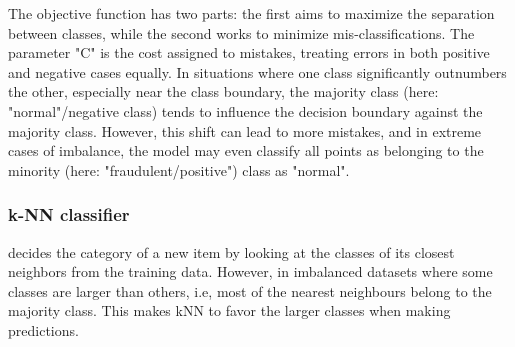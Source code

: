 \documentclass[letterpaper, 11 pt, conference]{ieeeconf}  %
\begin{document}
The objective function has two parts: the first aims to maximize the separation between classes, while the second works to minimize mis-classifications. The parameter "C" is the cost assigned to mistakes, treating errors in both positive and negative cases equally.
In situations where one class significantly outnumbers the other, especially near the class boundary, the majority class (here: "normal"/negative class) tends to influence the decision boundary against the majority class. However, this shift can lead to more mistakes, and in extreme cases of imbalance, the model may even classify all points as belonging to the minority (here: "fraudulent/positive") class as "normal".~\cite{10.1007/978-3-540-30115-8_7}
\subsubsection{k-NN classifier}
decides the category of a new item by looking at the classes of its closest neighbors from the training data. However, in imbalanced datasets where some classes are larger than others, i.e, most of the nearest neighbours belong to the majority class. This makes kNN to favor the larger classes when making predictions.\\
\end{document}
